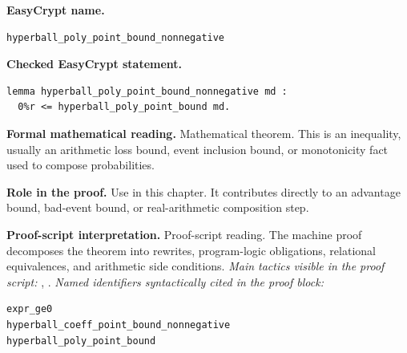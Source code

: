\begin{formaltheorem}
\noindent\textbf{EasyCrypt name.}
\begin{lstlisting}[language=EasyCrypt,basicstyle=\ttfamily\scriptsize]
hyperball_poly_point_bound_nonnegative
\end{lstlisting}
\noindent\textbf{Checked EasyCrypt statement.}
\begin{lstlisting}[language=EasyCrypt,basicstyle=\ttfamily\scriptsize]
lemma hyperball_poly_point_bound_nonnegative md :
  0%r <= hyperball_poly_point_bound md.
\end{lstlisting}
\noindent\textbf{Formal mathematical reading.}
Mathematical theorem. This is an inequality, usually an arithmetic loss bound, event inclusion bound, or monotonicity fact used to compose probabilities.

\noindent\textbf{Role in the proof.}
Use in this chapter. It contributes directly to an advantage bound, bad-event bound, or real-arithmetic composition step.

\noindent\textbf{Proof-script interpretation.}
Proof-script reading. The machine proof decomposes the theorem into rewrites, program-logic obligations, relational equivalences, and arithmetic side conditions.
\emph{Main tactics visible in the proof script:} , .
\emph{Named identifiers syntactically cited in the proof block:}
\begin{lstlisting}[language=EasyCrypt,basicstyle=\ttfamily\scriptsize]
expr_ge0
hyperball_coeff_point_bound_nonnegative
hyperball_poly_point_bound
\end{lstlisting}

\end{formaltheorem}

